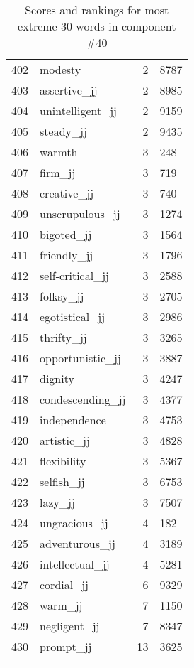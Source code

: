 \begin{longtable}[!htbp]{| rlr@{.}l |}
    402 & modesty & 2 & 8787 \\
    403 & assertive\_jj & 2 & 8985 \\
    404 & unintelligent\_jj & 2 & 9159 \\
    405 & steady\_jj & 2 & 9435 \\
    406 & warmth & 3 & 248 \\
    407 & firm\_jj & 3 & 719 \\
    408 & creative\_jj & 3 & 740 \\
    409 & unscrupulous\_jj & 3 & 1274 \\
    410 & bigoted\_jj & 3 & 1564 \\
    411 & friendly\_jj & 3 & 1796 \\
    412 & self-critical\_jj & 3 & 2588 \\
    413 & folksy\_jj & 3 & 2705 \\
    414 & egotistical\_jj & 3 & 2986 \\
    415 & thrifty\_jj & 3 & 3265 \\
    416 & opportunistic\_jj & 3 & 3887 \\
    417 & dignity & 3 & 4247 \\
    418 & condescending\_jj & 3 & 4377 \\
    419 & independence & 3 & 4753 \\
    420 & artistic\_jj & 3 & 4828 \\
    421 & flexibility & 3 & 5367 \\
    422 & selfish\_jj & 3 & 6753 \\
    423 & lazy\_jj & 3 & 7507 \\
    424 & ungracious\_jj & 4 & 182 \\
    425 & adventurous\_jj & 4 & 3189 \\
    426 & intellectual\_jj & 4 & 5281 \\
    427 & cordial\_jj & 6 & 9329 \\
    428 & warm\_jj & 7 & 1150 \\
    429 & negligent\_jj & 7 & 8347 \\
    430 & prompt\_jj & 13 & 3625 \\
    \hline
    \caption{Scores and rankings for most extreme 30 words in component \#40} \\
\end{longtable}
